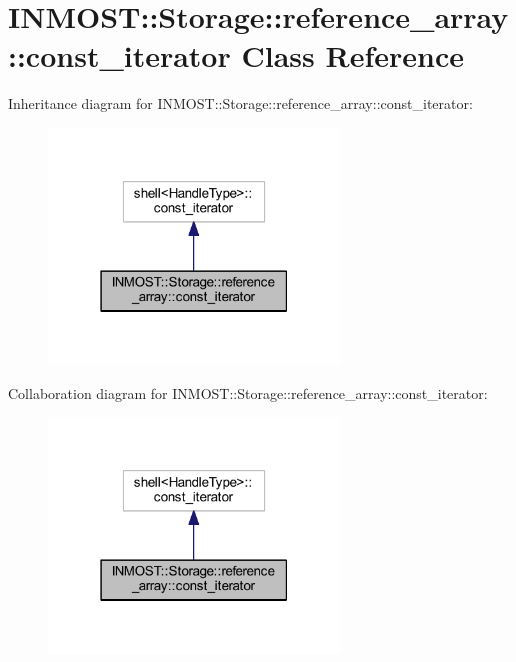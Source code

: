\hypertarget{classINMOST_1_1Storage_1_1reference__array_1_1const__iterator}{\section{I\-N\-M\-O\-S\-T\-:\-:Storage\-:\-:reference\-\_\-array\-:\-:const\-\_\-iterator Class Reference}
\label{classINMOST_1_1Storage_1_1reference__array_1_1const__iterator}
}


Inheritance diagram for I\-N\-M\-O\-S\-T\-:\-:Storage\-:\-:reference\-\_\-array\-:\-:const\-\_\-iterator\-:
\nopagebreak
\begin{figure}[H]
\begin{center}
\leavevmode
\includegraphics[width=219pt]{classINMOST_1_1Storage_1_1reference__array_1_1const__iterator__inherit__graph}
\end{center}
\end{figure}


Collaboration diagram for I\-N\-M\-O\-S\-T\-:\-:Storage\-:\-:reference\-\_\-array\-:\-:const\-\_\-iterator\-:
\nopagebreak
\begin{figure}[H]
\begin{center}
\leavevmode
\includegraphics[width=219pt]{classINMOST_1_1Storage_1_1reference__array_1_1const__iterator__coll__graph}
\end{center}
\end{figure}
